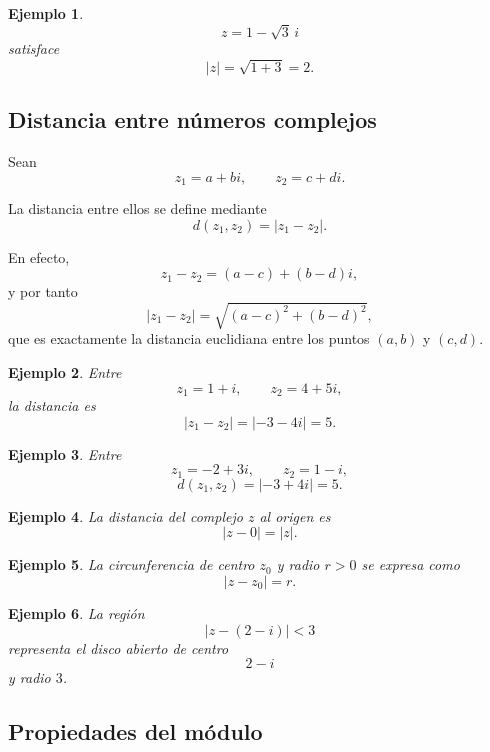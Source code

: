 \documentclass[12pt]{article}
\newtheorem{Ejem}{Ejemplo}
\begin{document}
\begin{Ejem} \[
z=1-\sqrt3\,i
\]
satisface
\[
|z|
=
\sqrt{1+3}
=
2.
\]
\end{Ejem}


\subsection*{Distancia entre números complejos}

Sean
\[
z_1=a+bi,
\qquad
z_2=c+di.
\]

La distancia entre ellos se define mediante
\[
\boxed{
d(z_1,z_2)=|z_1-z_2|.
}
\]

En efecto,
\[
z_1-z_2
=
(a-c)+(b-d)i,
\]
y por tanto
\[
|z_1-z_2|
=
\sqrt{(a-c)^2+(b-d)^2},
\]
que es exactamente la distancia euclidiana entre los puntos $(a,b)$ y $(c,d)$.


\begin{Ejem} Entre
\[
z_1=1+i,
\qquad
z_2=4+5i,
\]
la distancia es
\[
|z_1-z_2|
=
|-3-4i|
=
5.
\]

\end{Ejem}

\begin{Ejem} Entre
\[
z_1=-2+3i,
\qquad
z_2=1-i,
\]
\[
d(z_1,z_2)
=
|-3+4i|
=
5.
\]

\end{Ejem}

\begin{Ejem} La distancia del complejo $z$ al origen es
\[
|z-0|=|z|.
\]

\end{Ejem}

\begin{Ejem} La circunferencia de centro $z_0$ y radio $r>0$ se expresa como
\[
\boxed{|z-z_0|=r.}
\]

\end{Ejem}

\begin{Ejem} La región
\[
|z-(2-i)|<3
\]
representa el disco abierto de centro
\[
2-i
\]
y radio $3$.
\end{Ejem}


\subsection*{Propiedades del módulo}
\end{document}
